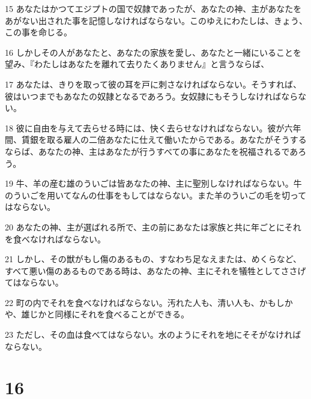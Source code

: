 \par 15 あなたはかつてエジプトの国で奴隷であったが、あなたの神、主があなたをあがない出された事を記憶しなければならない。このゆえにわたしは、きょう、この事を命じる。
\par 16 しかしその人があなたと、あなたの家族を愛し、あなたと一緒にいることを望み、『わたしはあなたを離れて去りたくありません』と言うならば、
\par 17 あなたは、きりを取って彼の耳を戸に刺さなければならない。そうすれば、彼はいつまでもあなたの奴隷となるであろう。女奴隷にもそうしなければならない。
\par 18 彼に自由を与えて去らせる時には、快く去らせなければならない。彼が六年間、賃銀を取る雇人の二倍あなたに仕えて働いたからである。あなたがそうするならば、あなたの神、主はあなたが行うすべての事にあなたを祝福されるであろう。
\par 19 牛、羊の産む雄のういごは皆あなたの神、主に聖別しなければならない。牛のういごを用いてなんの仕事をもしてはならない。また羊のういごの毛を切ってはならない。
\par 20 あなたの神、主が選ばれる所で、主の前にあなたは家族と共に年ごとにそれを食べなければならない。
\par 21 しかし、その獣がもし傷のあるもの、すなわち足なえまたは、めくらなど、すべて悪い傷のあるものである時は、あなたの神、主にそれを犠牲としてささげてはならない。
\par 22 町の内でそれを食べなければならない。汚れた人も、清い人も、かもしかや、雄じかと同様にそれを食べることができる。
\par 23 ただし、その血は食べてはならない。水のようにそれを地にそそがなければならない。

\chapter{16}

